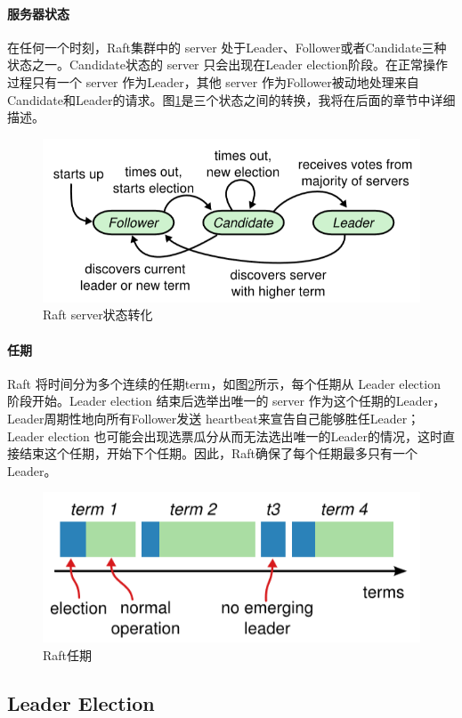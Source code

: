 \documentclass[UTF8]{article}
\begin{document}
\paragraph{服务器状态}

在任何一个时刻，Raft集群中的 server 处于Leader、Follower或者Candidate三种状态之一。Candidate状态的 server 只会出现在Leader election阶段。在正常操作过程只有一个 server 作为Leader，其他 server 作为Follower被动地处理来自Candidate和Leader的请求。图\ref{fig:raft_state}是三个状态之间的转换，我将在后面的章节中详细描述。

\begin{figure}[h]
	\centering
	\includegraphics[width=0.7\linewidth]{figures/raft_state}
	\caption{Raft server状态转化}
	\label{fig:raft_state}
\end{figure}


\paragraph{任期}

Raft 将时间分为多个连续的任期term，如图\ref{fig:raft_term}所示，每个任期从 Leader election 阶段开始。Leader election 结束后选举出唯一的 server 作为这个任期的Leader，Leader周期性地向所有Follower发送 heartbeat来宣告自己能够胜任Leader；Leader election 也可能会出现选票瓜分从而无法选出唯一的Leader的情况，这时直接结束这个任期，开始下个任期。因此，Raft确保了每个任期最多只有一个Leader。

\begin{figure}[h]
	\centering
	\includegraphics[width=0.5\linewidth]{figures/raft_term}
	\caption{Raft任期}
	\label{fig:raft_term}
\end{figure}

\subsection{Leader Election}\label{section:raft_leaderElectione}
\end{document}
